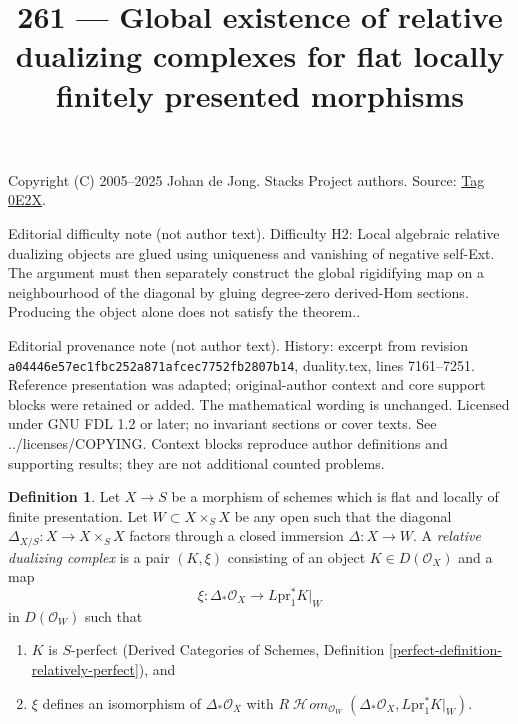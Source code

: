 \documentclass{amsart}
\theoremstyle{plain}
\theoremstyle{definition}
\newtheorem{definition}[subsection]{Definition}
\theoremstyle{remark}
\numberwithin{equation}{subsection}
\def\SheafHom{\mathop{\mathcal{H}\!\mathit{om}}\nolimits}
\begin{document}
\title[Stacks Project, Tag 0E2X]{261 --- Global existence of relative dualizing complexes for flat locally finitely presented morphisms}
\maketitle
\noindent Copyright (C) 2005--2025 Johan de Jong. Stacks Project authors. Source: \href{https://stacks.math.columbia.edu/tag/0E2X}{Tag 0E2X}.

\noindent Editorial difficulty note (not author text). Difficulty H2: Local algebraic relative dualizing objects are glued using uniqueness and vanishing of negative self-Ext. The argument must then separately construct the global rigidifying map on a neighbourhood of the diagonal by gluing degree-zero derived-Hom sections. Producing the object alone does not satisfy the theorem..

\noindent Editorial provenance note (not author text). History: excerpt from revision \texttt{a0444\allowbreak 6e57e\allowbreak c1fbc\allowbreak 252a8\allowbreak 71afc\allowbreak ec775\allowbreak 2fb28\allowbreak 07b14}, duality.tex, lines 7161--7251. Reference presentation was adapted; original-author context and core support blocks were retained or added. The mathematical wording is unchanged. Licensed under GNU FDL 1.2 or later; no invariant sections or cover texts. See ../licenses/COPYING. Context blocks reproduce author definitions and supporting results; they are not additional counted problems.

\begin{definition}
\label{definition-relative-dualizing-complex}
Let $X \to S$ be a morphism of schemes which is flat and
locally of finite presentation. Let $W \subset X \times_S X$
be any open such that the diagonal $\Delta_{X/S} : X \to X \times_S X$
factors through a closed immersion $\Delta : X \to W$.
A {\it relative dualizing complex} is a
pair $(K, \xi)$ consisting of an object $K \in D(\mathcal{O}_X)$
and a map
$$
\xi : \Delta_*\mathcal{O}_X \longrightarrow L\text{pr}_1^*K|_W
$$
in $D(\mathcal{O}_W)$ such that
\begin{enumerate}
\item $K$ is $S$-perfect (Derived Categories of Schemes, Definition
\ref{perfect-definition-relatively-perfect}), and
\item $\xi$ defines an isomorphism of $\Delta_*\mathcal{O}_X$
with
$R\SheafHom_{\mathcal{O}_W}(
\Delta_*\mathcal{O}_X, L\text{pr}_1^*K|_W)$.
\end{enumerate}
\end{definition}
\end{document}
